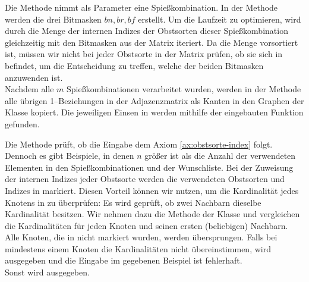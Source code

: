 Die Methode  nimmt als Parameter eine Spießkombination. 
In der Methode werden die drei Bitmasken $bn, br, bf$ erstellt.
Um die Laufzeit zu optimieren, wird durch die Menge der internen Indizes der Obstsorten 
dieser Spießkombination  gleichzeitig mit den Bitmasken aus der Matrix iteriert.
Da die Menge  vorsortiert ist, müssen wir nicht bei jeder Obstsorte in der Matrix
prüfen, ob sie sich in  befindet, um die Entscheidung zu treffen, welche der beiden
Bitmasken anzuwenden ist.\\
Nachdem alle $m$ Spießkombinationen verarbeitet wurden, werden in der Methode 
alle übrigen 1--Beziehungen in der Adjazenzmatrix
als Kanten in den Graphen  der Klasse  kopiert. 
Die jeweiligen Einsen in  werden mithilfe der eingebauten Funktion 
gefunden.

Die Methode  prüft, ob die Eingabe dem Axiom \ref{ax:obstsorte-index} folgt.
Dennoch es gibt Beispiele, in denen $n$ größer ist als die Anzahl der verwendeten Elementen in den
Spießkombinationen und der Wunschliste.
Bei der Zuweisung der internen Indizes jeder Obstsorte werden die verwendeten Obstsorten und Indizes
in  markiert. Diesen Vorteil können wir nutzen, um die Kardinalität
jedes Knotens in  zu überprüfen: Es wird geprüft, ob zwei Nachbarn dieselbe Kardinalität besitzen.
Wir nehmen dazu die Methode  der Klasse  und vergleichen die
Kardinalitäten für jeden Knoten und seinen ersten (beliebigen) Nachbarn. 
Alle Knoten, die in  nicht markiert wurden, werden übersprungen.
Falls bei mindestens einem Knoten die Kardinalitäten nicht übereinstimmen, wird  ausgegeben und
die Eingabe im gegebenen Beispiel ist fehlerhaft.\\
Sonst wird  ausgegeben.

